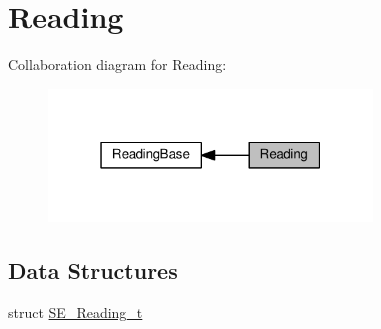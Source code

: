 \hypertarget{group__Reading}{}\section{Reading}
\label{group__Reading}
Collaboration diagram for Reading\+:\nopagebreak
\begin{figure}[H]
\begin{center}
\leavevmode
\includegraphics[width=244pt]{group__Reading}
\end{center}
\end{figure}
\subsection*{Data Structures}
\begin{DoxyCompactItemize}
\item 
struct \hyperlink{structSE__Reading__t}{S\+E\+\_\+\+Reading\+\_\+t}
\end{DoxyCompactItemize}
